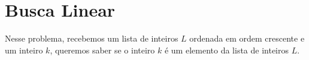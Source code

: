 \documentclass[a4paper,11pt]{article}
\begin{document}







	

\newpage 

\section*{Busca Linear}

Nesse problema, recebemos um lista de inteiros $L$ ordenada em ordem crescente e um inteiro $k$, queremos saber se o inteiro $k$ é um elemento da lista de inteiros $L$.
\end{document}
